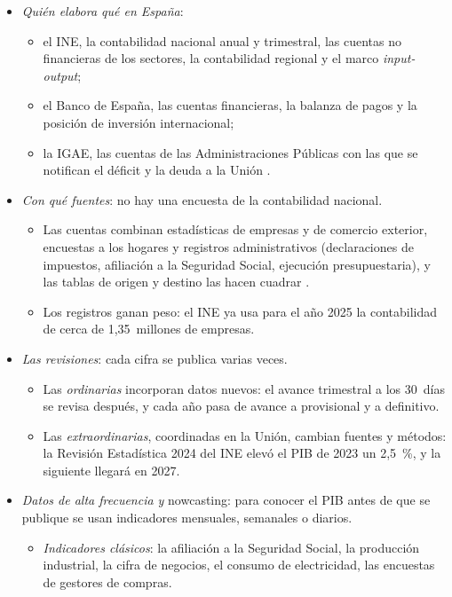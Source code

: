 \documentclass[11pt]{article}
\begin{document}
\begin{itemize}
\item \emph{Quién elabora qué en España}:
  \begin{itemize}
  \item el INE, la contabilidad nacional anual y trimestral, las cuentas no financieras de los sectores, la contabilidad regional y el marco \emph{input-output};
  \item el Banco de España, las cuentas financieras, la balanza de pagos y la posición de inversión internacional;
  \item la IGAE, las cuentas de las Administraciones Públicas con las que se notifican el déficit y la deuda a la Unión .
  \end{itemize}
\item \emph{Con qué fuentes}: no hay una encuesta de la contabilidad nacional.
  \begin{itemize}
  \item Las cuentas combinan estadísticas de empresas y de comercio exterior, encuestas a los hogares y registros administrativos (declaraciones de impuestos, afiliación a la Seguridad Social, ejecución presupuestaria), y las tablas de origen y destino las hacen cuadrar .
  \item Los registros ganan peso: el INE ya usa para el año 2025 la contabilidad de cerca de 1,35~millones de empresas\nocite{INE2026CNA2025}.
  \end{itemize}
\item \emph{Las revisiones}: cada cifra se publica varias veces.
  \begin{itemize}
  \item Las \emph{ordinarias} incorporan datos nuevos: el avance trimestral a los 30~días se revisa después, y cada año pasa de avance a provisional y a definitivo.
  \item Las \emph{extraordinarias}, coordinadas en la Unión, cambian fuentes y métodos: la Revisión Estadística 2024 del INE elevó el PIB de 2023 un 2,5~\%\nocite{INE2024CNARE2024}, y la siguiente llegará en 2027\nocite{INE2026avCNTR3T26}.
  \end{itemize}
\item \emph{Datos de alta frecuencia y} nowcasting: para conocer el PIB antes de que se publique se usan indicadores mensuales, semanales o diarios.
  \begin{itemize}
  \item \emph{Indicadores clásicos}: la afiliación a la Seguridad Social, la producción industrial, la cifra de negocios, el consumo de electricidad, las encuestas de gestores de compras.

\end{itemize}
\end{itemize}
\end{document}
